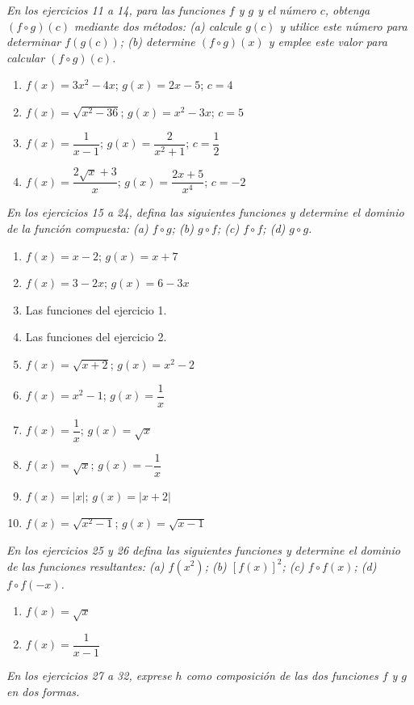 \documentclass[12pt]{article}
\theoremstyle{remark}
\begin{document}
\textit{En los ejercicios 11 a 14, para las funciones $f$ y $g$ y el número $c$, obtenga $(f\circ g)(c)$ mediante dos métodos: (a) calcule $g(c)$ y utilice este número para determinar $f(g(c))$; (b) determine $(f\circ g)(x)$ y emplee este valor para calcular $(f\circ g)(c)$.}

\begin{enumerate}[start=11]
\item $f(x)=3x^2-4x$; $g(x)=2x-5$; $c=4$
\item $f(x)=\sqrt{x^2-36}$; $g(x)=x^2-3x$; $c=5$
\item $f(x)=\dfrac1{x-1}$; $g(x)=\dfrac2{x^2+1}$; $c=\dfrac12$
\item $f(x)=\dfrac{2\sqrt{x}+3}{x}$; $g(x)=\dfrac{2x+5}{x^4}$; $c=-2$
\end{enumerate}

\textit{En los ejercicios 15 a 24, defina las siguientes funciones y determine el dominio de la función compuesta: (a) $f\circ g$; (b) $g\circ f$; (c) $f\circ f$; (d) $g\circ g$.}

\begin{enumerate}[start=15]
\item $f(x)=x-2$; $g(x)=x+7$
\item $f(x)=3-2x$; $g(x)=6-3x$
\item Las funciones del ejercicio 1.
\item Las funciones del ejercicio 2.
\item $f(x)=\sqrt{x+2}$; $g(x)=x^2-2$
\item $f(x)=x^2-1$; $g(x)=\dfrac1x$
\item $f(x)=\dfrac1x$; $g(x)=\sqrt{x}$
\item $f(x)=\sqrt{x}$; $g(x)=-\dfrac1x$
\item $f(x)=|x|$; $g(x)=|x+2|$
\item $f(x)=\sqrt{x^2-1}$; $g(x)=\sqrt{x-1}$
\end{enumerate}

\textit{En los ejercicios 25 y 26 defina las siguientes funciones y determine el dominio de las funciones resultantes: (a) $f(x^2)$; (b) $[f(x)]^2$; (c) $f\circ f(x)$; (d) $f\circ f(-x)$.}

\begin{enumerate}[start=25]
\item $f(x)=\sqrt{x}$
\item $f(x)=\dfrac1{x-1}$
\end{enumerate}

\textit{En los ejercicios 27 a 32, exprese $h$ como composición de las dos funciones $f$ y $g$ en dos formas.}
\end{document}
